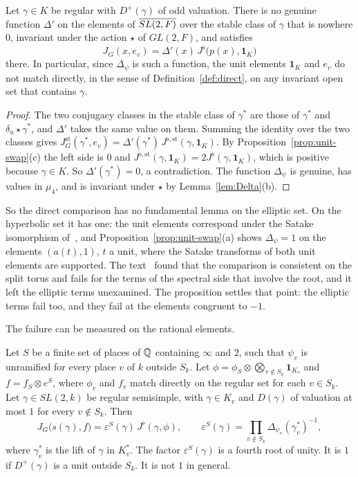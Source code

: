 \begin{corollary}\label{cor:no-fl}
Let $\gamma\in K$ be regular with $D^+(\gamma)$ of odd valuation. There
is no genuine function $\Delta'$ on the elements of $\overline{SL(2,F)}$ over the stable
class of $\gamma$ that is nowhere $0$, invariant under the action $\star$
of $GL(2,F)$, and satisfies
\[
J_G(x,e_v)=\Delta'(x)\,J^\flat\bigl(p(x),\mathbf 1_K\bigr)
\]
there. In particular, since $\Delta_\psi$ is such a function, the unit
elements $\mathbf 1_K$ and $e_v$ do not match directly, in the sense of
Definition~\ref{def:direct}, on any invariant open set that contains
$\gamma$.
\end{corollary}

\begin{proof}
The two conjugacy classes in the stable class of $\gamma^*$ are those of
$\gamma^*$ and $\delta_u\star\gamma^*$, and $\Delta'$ takes the same value
on them. Summing the identity over the two classes gives
$J^{\mathrm{st}}_G(\gamma^*,e_v)=\Delta'(\gamma^*)\,J^{\flat,\mathrm{st}}(
\gamma,\mathbf 1_K)$. By Proposition~\ref{prop:unit-swap}(c) the left side
is $0$ and $J^{\flat,\mathrm{st}}(\gamma,\mathbf 1_K)=2J^\flat(\gamma,
\mathbf 1_K)$, which is positive because $\gamma\in K$. So
$\Delta'(\gamma^*)=0$, a contradiction. The function $\Delta_\psi$ is
genuine, has values in $\mu_4$, and is invariant under $\star$ by
Lemma~\ref{lem:Delta}(b).
\end{proof}

So the direct comparison has no fundamental lemma on the elliptic set.
On the hyperbolic set it has one: the unit elements correspond under the
Satake isomorphism of~\cite{JC26}, and Proposition~\ref{prop:unit-swap}(a)
shows $\Delta_\psi=1$ on the elements $(a(t),1)$, $t$ a unit, where
the Satake transforms of both unit elements are supported. The
text~\cite{JC26} found that the comparison is consistent on the split
torus and fails for the terms of the spectral side that involve the
root, and it left the elliptic terms unexamined. The proposition settles
that point: the elliptic terms fail too, and they fail at the elements
congruent to $-1$.

The failure can be measured on the rational elements.

\begin{proposition}\label{prop:epsilon}
Let $S$ be a finite set of places of $\mathbb{Q}$ containing $\infty$ and $2$,
such that $\psi_v$ is unramified for every place $v$ of $k$ outside
$S_k$. Let $\phi=\phi_S\otimes\bigotimes_{v\notin S_k}\mathbf 1_{K_v}$ and
$f=f_S\otimes e^S$, where $\phi_v$ and $f_v$ match directly on the regular
set for each $v\in S_k$. Let $\gamma\in SL(2,k)$ be regular semisimple,
with $\gamma\in K_v$ and $D(\gamma)$ of valuation at most $1$ for every
$v\notin S_k$. Then
\[
J_G\bigl(s(\gamma),f\bigr)=\varepsilon^S(\gamma)\,J^\flat(\gamma,\phi),\qquad
\varepsilon^S(\gamma)=\prod_{v\notin S_k}\Delta_{\psi_v}(\gamma^*_v)^{-1},
\]
where $\gamma_v^*$ is the lift of $\gamma$ in $K_v^*$. The factor
$\varepsilon^S(\gamma)$ is a fourth root of unity. It is $1$ if
$D^+(\gamma)$ is a unit outside $S_k$. It is not $1$ in general.
\end{proposition}

